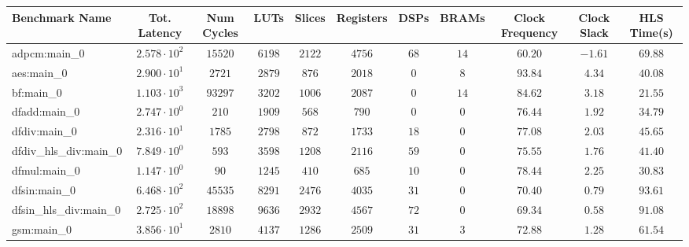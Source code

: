 \begin{tabular}{|l|c|c|c|c|c|c|c|c|c|c|}
\hline
Benchmark Name          & Tot. Latency           & Num Cycles & LUTs      & Slices    & Registers & DSPs    & BRAMs   & Clock Frequency & Clock Slack & HLS Time(s) \\
\hline
adpcm:main\_0           & $ 2.578 \cdot 10^{2} $ & $ 15520  $ & $ 6198  $ & $ 2122  $ & $ 4756  $ & $ 68  $ & $ 14  $ & $ 60.20       $ & $ -1.61   $ & $ 69.88   $ \\
aes:main\_0             & $ 2.900 \cdot 10^{1} $ & $ 2721   $ & $ 2879  $ & $ 876   $ & $ 2018  $ & $ 0   $ & $ 8   $ & $ 93.84       $ & $ 4.34    $ & $ 40.08   $ \\
bf:main\_0              & $ 1.103 \cdot 10^{3} $ & $ 93297  $ & $ 3202  $ & $ 1006  $ & $ 2087  $ & $ 0   $ & $ 14  $ & $ 84.62       $ & $ 3.18    $ & $ 21.55   $ \\
dfadd:main\_0           & $ 2.747 \cdot 10^{0} $ & $ 210    $ & $ 1909  $ & $ 568   $ & $ 790   $ & $ 0   $ & $ 0   $ & $ 76.44       $ & $ 1.92    $ & $ 34.79   $ \\
dfdiv:main\_0           & $ 2.316 \cdot 10^{1} $ & $ 1785   $ & $ 2798  $ & $ 872   $ & $ 1733  $ & $ 18  $ & $ 0   $ & $ 77.08       $ & $ 2.03    $ & $ 45.65   $ \\
dfdiv\_hls\_div:main\_0 & $ 7.849 \cdot 10^{0} $ & $ 593    $ & $ 3598  $ & $ 1208  $ & $ 2116  $ & $ 59  $ & $ 0   $ & $ 75.55       $ & $ 1.76    $ & $ 41.40   $ \\
dfmul:main\_0           & $ 1.147 \cdot 10^{0} $ & $ 90     $ & $ 1245  $ & $ 410   $ & $ 685   $ & $ 10  $ & $ 0   $ & $ 78.44       $ & $ 2.25    $ & $ 30.83   $ \\
dfsin:main\_0           & $ 6.468 \cdot 10^{2} $ & $ 45535  $ & $ 8291  $ & $ 2476  $ & $ 4035  $ & $ 31  $ & $ 0   $ & $ 70.40       $ & $ 0.79    $ & $ 93.61   $ \\
dfsin\_hls\_div:main\_0 & $ 2.725 \cdot 10^{2} $ & $ 18898  $ & $ 9636  $ & $ 2932  $ & $ 4567  $ & $ 72  $ & $ 0   $ & $ 69.34       $ & $ 0.58    $ & $ 91.08   $ \\
gsm:main\_0             & $ 3.856 \cdot 10^{1} $ & $ 2810   $ & $ 4137  $ & $ 1286  $ & $ 2509  $ & $ 31  $ & $ 3   $ & $ 72.88       $ & $ 1.28    $ & $ 61.54   $ \\

\end{tabular}
